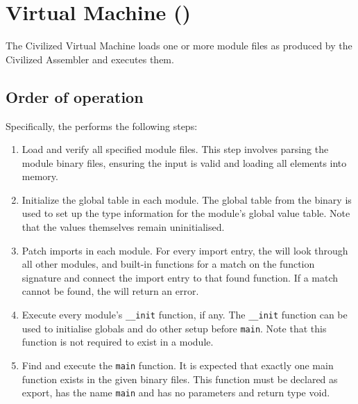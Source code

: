 \section{\civic{} Virtual Machine (\civicvm)}

The Civilized Virtual Machine \civicvm{} loads one or more module files as produced by the Civilized Assembler \civicas{} and executes them.

\subsection{Order of operation}

Specifically, the \civicvm{} performs the following steps:

\begin{enumerate}
    \item Load and verify all specified module files. This step involves parsing the module binary files, ensuring the input is valid and loading all elements into memory.

    \item Initialize the global table in each module. The global table from the binary is used to set up the type information for the module's global value table. Note that the values themselves remain uninitialised.

    \item Patch imports in each module. For every import entry, the \civicvm{} will look through all other modules, and built-in functions for a match on the function signature and connect the import entry to that found function. If a match cannot be found, the \civicvm{} will return an error.

    \item Execute every module's \texttt{\_\_init} function, if any. The \texttt{\_\_init} function can be used to initialise globals and do other setup before \texttt{main}. Note that this function is not required to exist in a module.

    \item Find and execute the \texttt{main} function. It is expected that exactly one main function exists in the given binary files. This function must be declared as export, has the name \texttt{main} and has no parameters and return type void.

\end{enumerate}

